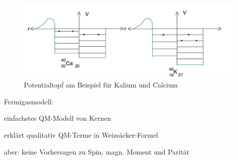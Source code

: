 \begin{figure}[!ht]
\centering
\includegraphics[width=.5\textwidth]{imgs/ep5-fig-4-10.pdf}
\caption{Potentialtopf am Beispiel für Kalium und Calcium \label{fig:4.10}}
\end{figure}

Fermigasmodell:
\begin{compactitem}
\item einfachstes QM-Modell von Kernen
\item erklärt qualitativ QM-Terme in Weizsäcker-Formel
\item aber: keine Vorhersagen zu Spin, magn. Moment und Parität
\end{compactitem}

